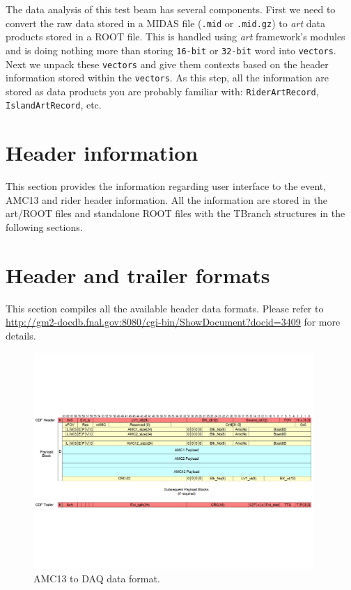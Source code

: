 \documentclass[12pt,letterpaper]{article}
\begin{document}
The data analysis of this test beam has several components. First we need to convert the raw data stored in a MIDAS file (\verb+.mid+ or \verb+.mid.gz+) to \textit{art} data products stored in a ROOT file.
This is handled using \textit{art} framework's modules and is doing nothing more than storing \verb+16-bit+ or \verb+32-bit+ word into \verb+vectors+. Next we unpack these \verb+vectors+
and give them contexts based on the header information stored within the \verb+vectors+. As this step, all the information are stored as data products you are probably familiar with: \verb+RiderArtRecord+,
 \verb+IslandArtRecord+, etc.

\section{Header information}
This section provides the information regarding user interface to the event, AMC13 and rider header information. All the information are stored in the art/ROOT files and standalone ROOT files with the TBranch structures in the following sections.

\section{Header and trailer formats}

This section compiles all the available header data formats. Please refer to \url{http://gm2-docdb.fnal.gov:8080/cgi-bin/ShowDocument?docid=3409} for more details.

\begin{figure}[htbp]
\centering
\includegraphics[trim=0cm 6cm 0cm 6cm ,width=0.95\textwidth]{pics/AMC13Header}
\caption{AMC13 to DAQ data format.}
\end{figure}
\end{document}

